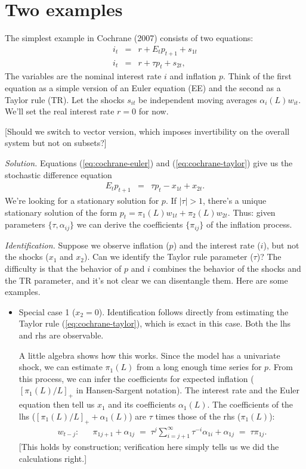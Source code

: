 \documentclass[11pt]{article}
\begin{document}
{\section{Two examples}


The simplest example in Cochrane (2007) consists of two equations:
\begin{eqnarray}
    i_t &=& r + E_t p_{t+1} + s_{1t}
        \label{eq:cochrane-euler} \\
    i_t &=& r + \tau p_t + s_{2t} ,
        \label{eq:cochrane-taylor}
\end{eqnarray}
The variables are the nominal interest rate $i$ and inflation $p$.
Think of the first equation as a simple version of an Euler equation (EE)
and the second as a Taylor rule (TR).
Let the shocks $s_{it}$ be independent moving averages $\alpha_i(L)w_{it}$.
We'll set the real interest rate $r = 0 $ for now.

[Should we switch to vector version, which imposes invertibility on the
overall system but not on subsets?]

{\it Solution.}
Equations (\ref{eq:cochrane-euler}) and (\ref{eq:cochrane-taylor})
give us the stochastic difference equation
\begin{eqnarray}
    E_t p_{t+1} &=& \tau p_t - x_{1t} + x_{2t} .
        \label{eq:cochrane-diff}
\end{eqnarray}
We're looking for a stationary solution for $p$.
If $|\tau |>1 $, there's a unique stationary solution of the form
$ p_t = \pi_1(L) w_{1t} + \pi_2(L) w_{2t}$.
Thus:  given parameters $\{ \tau,\alpha_{ij} \}$ we
can derive the coefficients $\{ \pi_{ij} \}$ of the inflation process.

{\it Identification.}
Suppose we observe inflation ($p$) and the interest rate ($i$),
but not the shocks ($x_1$ and $x_2$).
Can we identify the Taylor rule parameter ($\tau$)?
The difficulty is that the behavior of $p$ and $i$ combines
the behavior of the shocks and the TR parameter,
and it's not clear we can disentangle them.
Here are some examples.

\begin{itemize}
\item Special case 1 ($x_2=0$).
Identification follows directly from estimating the
Taylor rule (\ref{eq:cochrane-taylor}),
which is exact in this case.
Both the lhs and rhs are observable.

A little algebra shows how this works.
Since the model has a univariate shock,
we can estimate $ \pi_1(L)$ from a long enough time series for $p$.
From this process, we can infer the coefficients for expected inflation
($[\pi_1(L)/L]_+$ in Hansen-Sargent notation).
The interest rate and the Euler equation then tell us $x_1$
and its coefficients $\alpha_1(L)$.
The coefficients of the lhs ($[\pi_1(L)/L]_+ + \alpha_1(L)$) are
$\tau$ times those of the rhs ($\pi_1(L)$):
\begin{eqnarray*}
    w_{t-j}:  &&  \pi_{1j+1} + \alpha_{1j} \;=\;
                \tau^j \sum_{i=j+1}^{\infty} \tau^{-i} \alpha_{1i}
                    + \alpha_{1j}
                \;=\; \tau \pi_{1j} .
\end{eqnarray*}
[This holds by construction; verification here simply
tells us we did the calculations right.]



\end{itemize}}
\end{document}
